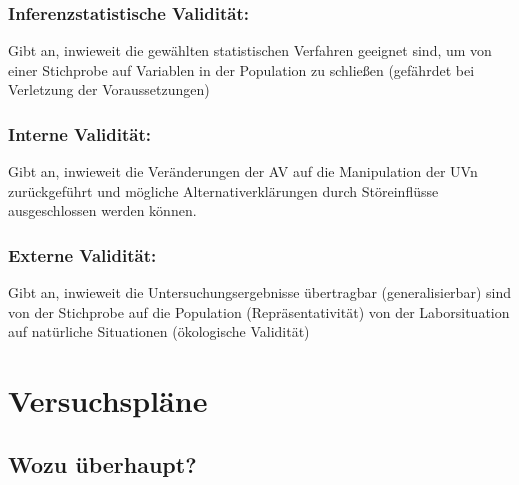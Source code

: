 \documentclass[
]{book}
\begin{document}
\hypertarget{inferenzstatistische-validituxe4t-1}{%
\subsubsection{Inferenzstatistische Validität:}\label{inferenzstatistische-validituxe4t-1}}

Gibt an, inwieweit die gewählten statistischen Verfahren geeignet sind, um von einer Stichprobe
auf Variablen in der Population zu schließen (gefährdet bei Verletzung der Voraussetzungen)

\hypertarget{interne-validituxe4t-1}{%
\subsubsection{Interne Validität:}\label{interne-validituxe4t-1}}

Gibt an, inwieweit die Veränderungen der AV auf die Manipulation der UVn zurückgeführt und
mögliche Alternativerklärungen durch Störeinflüsse ausgeschlossen werden können.

\hypertarget{externe-validituxe4t-1}{%
\subsubsection{Externe Validität:}\label{externe-validituxe4t-1}}

Gibt an, inwieweit die Untersuchungsergebnisse übertragbar (generalisierbar) sind
von der Stichprobe auf die Population (Repräsentativität)
von der Laborsituation auf natürliche Situationen (ökologische Validität)

\hypertarget{versuchspluxe4ne}{%
\section{Versuchspläne}\label{versuchspluxe4ne}}

\hypertarget{wozu-uxfcberhaupt-2}{%
\subsection{Wozu überhaupt?}\label{wozu-uxfcberhaupt-2}}
\end{document}
